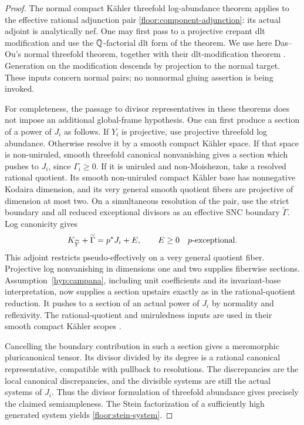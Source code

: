 \begin{proof}
The normal compact K\"ahler threefold log-abundance theorem applies to
the effective rational adjunction pair
\eqref{floor:component-adjunction}: its actual adjoint is analytically
nef.  One may first pass to a projective crepant dlt modification and
use the $\mathbb{Q}$-factorial dlt form of the theorem.  We use here
Das--Ou's normal threefold theorem, together with their dlt-modification
theorem \cite[Corollary~1.3]{DasOuAbundanceII}
\cite[Theorem~5.2]{DasOuAbundanceI}.  Generation on the modification
descends by projection to the normal target.  These inputs concern
normal pairs; no nonnormal gluing assertion is being invoked.

For completeness, the passage to divisor representatives in these
theorems does not impose an additional global-frame hypothesis.  One
can first produce a section of a power of $J_i$ as follows.  If $Y_i$
is projective, use projective threefold log abundance.  Otherwise
resolve it by a smooth compact K\"ahler space.  If that space is
non-uniruled, smooth threefold canonical nonvanishing gives a section
which pushes to $J_i$, since $\Gamma_i\ge0$.  If it is uniruled and
non-Moishezon, take a resolved rational quotient.  Its smooth
non-uniruled compact K\"ahler base has nonnegative Kodaira dimension,
and its very general smooth quotient fibers are projective of
dimension at most two.  On a simultaneous resolution of the pair,
use the strict boundary and all reduced exceptional divisors as an
effective SNC boundary $\widetilde\Gamma$.  Log canonicity gives
\[
 K_{\widetilde Y}+\widetilde\Gamma
   =p^*J_i+E,\qquad E\ge0\quad\hbox{$p$-exceptional}.
\]
This adjoint restricts pseudo-effectively on a very general quotient
fiber.  Projective log nonvanishing in dimensions one and two supplies
fiberwise sections.  Assumption~\ref{hyp:campana}, including unit
coefficients and its invariant-base interpretation, now supplies a
section upstairs exactly as in the rational-quotient reduction.  It
pushes to a section of an actual power of $J_i$ by normality and
reflexivity.  The rational-quotient and uniruledness inputs are used in
their smooth compact K\"ahler scopes
\cite{CampanaRationalQuotient,OuUniruledness}.

Cancelling the boundary contribution in such a section gives a
meromorphic pluricanonical tensor.  Its divisor divided by its degree
is a rational canonical representative, compatible with pullback to
resolutions.  The discrepancies are the local canonical
discrepancies, and the divisible systems are still the actual
systems of $J_i$.  Thus the divisor formulation of threefold
abundance gives precisely the claimed semiampleness.  The Stein
factorization of a sufficiently high generated system yields
\eqref{floor:stein-system}.
\end{proof}

